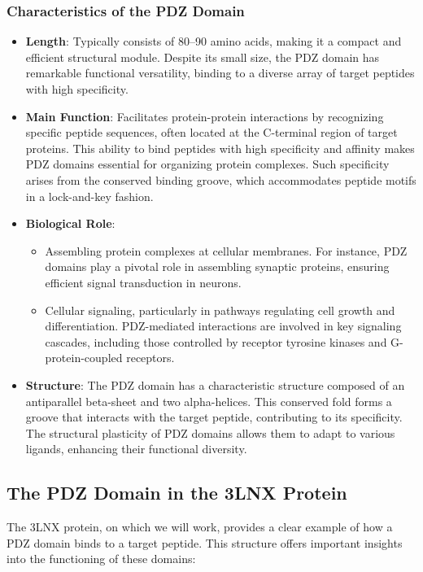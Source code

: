 \documentclass[English, Lau, oneside]{sapthesis}
\begin{document}
\subsubsection*{Characteristics of the PDZ Domain}
\begin{itemize}
    \item \textbf{Length}: Typically consists of 80--90 amino acids, making it a compact and efficient structural module. Despite its small size, the PDZ domain has remarkable functional versatility, binding to a diverse array of target peptides with high specificity.
    \item \textbf{Main Function}: Facilitates protein-protein interactions by recognizing specific peptide sequences, often located at the C-terminal region of target proteins. This ability to bind peptides with high specificity and affinity makes PDZ domains essential for organizing protein complexes. Such specificity arises from the conserved binding groove, which accommodates peptide motifs in a lock-and-key fashion.\cite{song1997}
    \item \textbf{Biological Role}:
    \begin{itemize}
        \item Assembling protein complexes at cellular membranes. For instance, PDZ domains play a pivotal role in assembling synaptic proteins, ensuring efficient signal transduction in neurons.
        \item Cellular signaling, particularly in pathways regulating cell growth and differentiation. PDZ-mediated interactions are involved in key signaling cascades, including those controlled by receptor tyrosine kinases and G-protein-coupled receptors.
    \end{itemize}
    \item \textbf{Structure}: The PDZ domain has a characteristic structure composed of an antiparallel beta-sheet and two alpha-helices. This conserved fold forms a groove that interacts with the target peptide, contributing to its specificity. The structural plasticity of PDZ domains allows them to adapt to various ligands, enhancing their functional diversity.\cite{harris2001}
\end{itemize}

\subsection*{The PDZ Domain in the 3LNX Protein}

\noindent The 3LNX protein, on which we will work, provides a clear example of how a PDZ domain binds to a target peptide. This structure offers important insights into the functioning of these domains:
\end{document}
